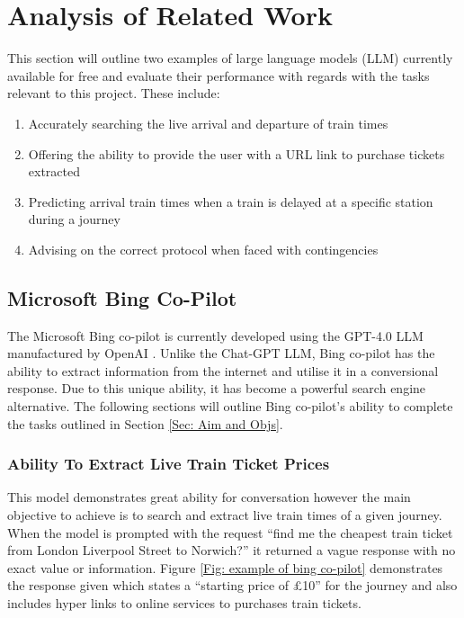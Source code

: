 \section{Analysis of Related Work}\label{sec: related works}
This section will outline two examples of large language models (LLM) currently available for free and evaluate their performance with regards with the tasks relevant to this project. These include:
\begin{enumerate}
    \item Accurately searching the live arrival and departure of train times
    \item Offering the ability to provide the user with a URL link to purchase tickets extracted
    \item Predicting arrival train times when a train is delayed at a specific station during a journey
    \item Advising on the correct protocol when faced with contingencies
\end{enumerate}
\subsection{Microsoft Bing Co-Pilot}\label{Sec: Review Bing co-pilot}
The Microsoft Bing co-pilot is currently developed using the GPT-4.0 LLM manufactured by OpenAI \citep{bing-gpt4}. Unlike the Chat-GPT LLM, Bing co-pilot has the ability to extract information from the internet and utilise it in a conversional response. Due to this unique ability, it has become a powerful search engine alternative. The following sections will outline Bing co-pilot's ability to complete the tasks outlined in Section \ref{Sec: Aim and Objs}.

\subsubsection{Ability To Extract Live Train Ticket Prices}
This model demonstrates great ability for conversation however the main objective to achieve is to search and extract live train times of a given journey. When the model is prompted with the request ``find me the cheapest train ticket from London Liverpool Street to Norwich?'' it returned a vague response with no exact value or information. Figure \ref{Fig: example of bing co-pilot} demonstrates the response given which states a ``starting price of £10'' for the journey and also includes hyper links to online services to purchases train tickets.\vspace{0.5cm}

